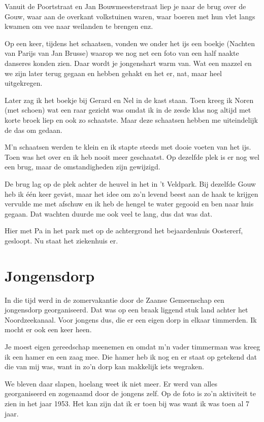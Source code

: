 \documentclass[10pt,twoside,openright]{memoir}
\newlength{\drop}%
\begin{document}
Vanuit de Poortstraat en Jan Bouwmeesterstraat liep je naar de brug over de Gouw, waar aan de overkant volkstuinen waren, waar boeren met hun vlet langs kwamen om vee naar weilanden te brengen enz. 

Op een keer, tijdens het schaatsen, vonden we onder het ijs een boekje (Nachten van Parijs van Jan Brusse) waarop we nog net een foto van een half naakte danseres konden zien. Daar wordt je jongenshart warm van. Wat een mazzel en we zijn later terug gegaan en hebben gehakt en het er, nat, maar heel uitgekregen. 

Later zag ik het boekje bij Gerard en Nel in de kast staan. 
Toen kreeg ik Noren (met schoen) wat een raar gezicht was omdat ik in de zesde klas nog altijd met korte broek liep en ook zo schaatste. Maar deze schaatsen hebben me uiteindelijk de das om gedaan. 

M’n schaatsen werden te klein en ik stapte steeds met dooie voeten van het ijs. Toen was het over en ik heb nooit meer geschaatst. Op dezelfde plek is er nog wel een brug, maar de 
omstandigheden zijn gewijzigd. 

De brug lag op de plek achter de heuvel in het in ’t Veldpark. Bij dezelfde Gouw heb ik één keer gevist, maar het idee om zo’n levend beest aan de haak te krijgen vervulde me met afschuw en ik heb de hengel te water gegooid en ben naar huis gegaan. Dat wachten duurde me ook veel te lang, dus dat was dat. 

Hier met Pa in het park met op de achtergrond het bejaardenhuis Oostererf, gesloopt. Nu staat het ziekenhuis er.

\chapter{Jongensdorp} %
\label{cha:jongensdrop}

In die tijd werd in de zomervakantie door de Zaanse Gemeenschap een jongensdorp georganiseerd. Dat was op een braak liggend stuk land achter het Noordzeekanaal. Voor jongens dus, die er een eigen dorp in elkaar timmerden. Ik mocht er ook een keer heen. 

Je moest eigen gereedschap meenemen en omdat m’n vader timmerman was kreeg ik een hamer en een zaag mee. Die hamer heb ik nog en er staat op getekend dat die van mij was, want in zo’n dorp kan makkelijk iets wegraken. 

We bleven daar slapen, hoelang weet ik niet meer. Er werd van alles georganiseerd en zogenaamd door de jongens zelf. Op de foto is zo’n aktiviteit te zien in het jaar 1953. Het kan zijn dat ik er toen bij was want ik was toen al 7 jaar.
\end{document}
